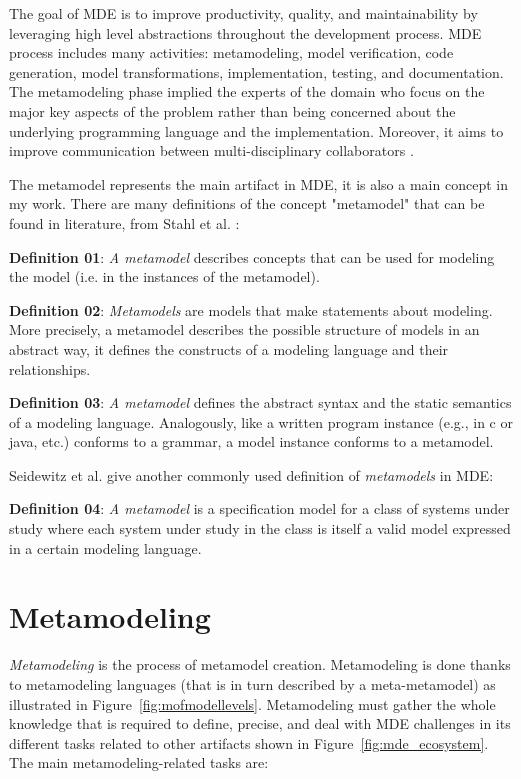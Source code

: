 
The goal of MDE is to improve productivity, quality, and maintainability by leveraging high level abstractions throughout the development process. MDE process includes many activities: metamodeling, model verification, code generation, model transformations, implementation, testing, and documentation. The metamodeling phase implied the experts of the domain who focus on the major key aspects of the problem rather than being concerned about the underlying programming language and the implementation. Moreover, it aims to improve communication between multi-disciplinary collaborators \cite{wortmann2020modeling}.

The metamodel represents the main artifact in MDE, it is also a main concept in my work. There are many definitions of the concept "metamodel" that can be found in literature, from Stahl et al. \cite{stahl2006model}:

\textbf{Definition 01}: \textit{A metamodel} describes concepts that can be used for modeling the model (i.e. in the instances of the metamodel).

\textbf{Definition 02}: \textit {Metamodels} are models that make statements about modeling. More precisely, a metamodel describes the possible structure of models in an abstract way, it defines the constructs of a modeling language and their relationships.

\textbf{Definition 03}: \textit{A metamodel} defines the abstract syntax and the static semantics of a modeling language. Analogously, like a written program instance (e.g., in c or java, etc.) conforms to a grammar, a model instance conforms to a metamodel.

Seidewitz et al. \cite{seidewitz2003models} give another commonly used definition of \textit{metamodels} in MDE:

\textbf{Definition 04}: \textit{A metamodel} is a specification model for a class of systems under study where each system under study in the class is itself a valid model expressed in a certain modeling language.

\section{Metamodeling}
\label{Metamodeling}
\textit{Metamodeling} is the process of metamodel creation. Metamodeling is done thanks to metamodeling languages (that is in turn described by a meta-metamodel) as illustrated in Figure~\ref{fig:mofmodellevels}. Metamodeling must gather the whole knowledge that is required to define, precise, and deal with MDE challenges in its different tasks \cite{wortmann2020modeling} related to other artifacts shown in Figure~\ref{fig:mde_ecosystem}. The main metamodeling-related tasks are:

